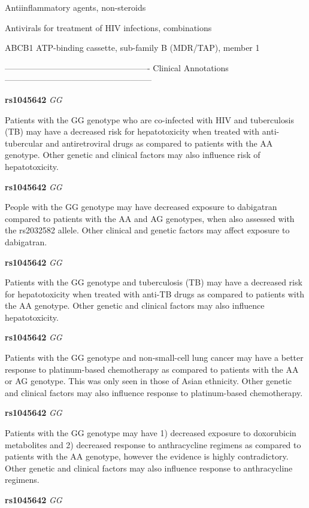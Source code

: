 \documentclass{resume} %
\begin{document}
\begin{rSection}{ Antiinflammatory agents, non-steroids }
\end{rSection}\begin{rSection}{ Antivirals for treatment of HIV infections, combinations }
\item[]

\begin{rSubsection}{ ABCB1 }{ ATP-binding cassette, sub-family B (MDR/TAP), member 1 }{}{}
\item[]

\item[] ---------------------------------------------------- Clinical Annotations -----------------------------------------------------\newline
\item \textbf{ rs1045642 } \textit{ GG }
\item[] Patients with the GG genotype who are co-infected with HIV and tuberculosis (TB) may have a decreased risk for hepatotoxicity when treated with anti-tubercular and antiretroviral drugs as compared to patients with the AA genotype. Other genetic and clinical factors may also influence risk of hepatotoxicity.\item \textbf{ rs1045642 } \textit{ GG }
\item[] People with the GG genotype may have decreased exposure to dabigatran compared to patients with the AA and AG genotypes, when also assessed with the rs2032582 allele. Other clinical and genetic factors may affect exposure to dabigatran.\item \textbf{ rs1045642 } \textit{ GG }
\item[] Patients with the GG genotype and tuberculosis (TB) may have a decreased risk for hepatotoxicity when treated with anti-TB drugs as compared to patients with the AA genotype. Other genetic and clinical factors may also influence hepatotoxicity.\item \textbf{ rs1045642 } \textit{ GG }
\item[] Patients with the GG genotype and non-small-cell lung cancer may have a better response to platinum-based chemotherapy as compared to patients with the AA or AG genotype. This was only seen in those of Asian ethnicity. Other genetic and clinical factors may also influence response to platinum-based chemotherapy.\item \textbf{ rs1045642 } \textit{ GG }
\item[] Patients with the GG genotype may have 1) decreased exposure to doxorubicin metabolites and 2) decreased response to anthracycline regimens as compared to patients with the AA genotype, however the evidence is highly contradictory. Other genetic and clinical factors may also influence response to anthracycline regimens.\item \textbf{ rs1045642 } \textit{ GG }

\end{rSubsection}
\end{rSection}
\end{document}
